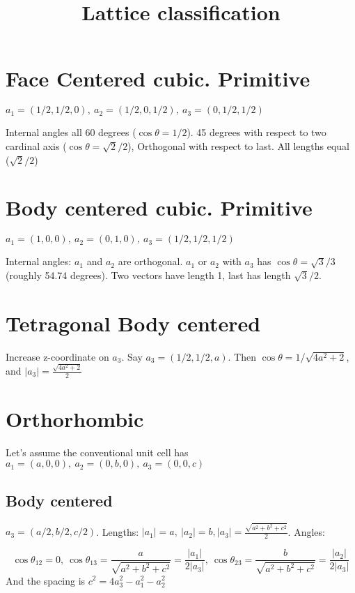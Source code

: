 \documentclass[a4paper,10pt]{article} 	%
\title{Lattice classification}
\author{}
\date{}
\numberwithin{equation}{section}
\begin{document}
	\maketitle

	\section{Face Centered cubic. Primitive}
	$a_1 = (1/2, 1/2, 0),\ a_2 = (1/2, 0, 1/2),\ a_3 = (0, 1/2, 1/2)$
	
	Internal angles all 60 degrees ($\cos \theta = 1/2$). 45 degrees with respect to two cardinal axis ($\cos \theta = \sqrt{2}/2$), Orthogonal with respect to last. All lengths equal ($\sqrt{2}/2$)
	
	\section{Body centered cubic. Primitive}
	$ a_1 = (1,0,0),\ a_2 = (0,1,0),\ a_3 = (1/2,1/2,1/2) $
	
	Internal angles: $a_1$ and $a_2$ are orthogonal. $a_1$ or $a_2$ with $a_3$ has $\cos \theta = \sqrt{3}/3 $ (roughly 54.74 degrees). Two vectors have length 1, last has length $\sqrt{3}/2$.
	
	\section{Tetragonal Body centered}
	Increase z-coordinate on $a_3$. Say $a_3 = (1/2,1/2,a) $. Then $\cos \theta = 1/\sqrt{4a^2+2} $, and $|a_3| = \frac{\sqrt{4a^2+2}}{2}$
	
	\section{Orthorhombic}
	Let's assume the conventional unit cell has $a_1 = (a,0,0),\ a_2 = (0,b,0),\ a_3 = (0,0,c)$
	
	\subsection{Body centered}
	$a_3 = (a/2, b/2, c/2)$. Lengths: $|a_1| = a,\ |a_2| = b, |a_3| = \frac{\sqrt{a^2+b^2+c^2}}{2}$. Angles: 
	
	\begin{equation}
		\cos \theta_{12} = 0,\ \cos \theta_{13} = \frac{a}{\sqrt{a^2+b^2+c^2}} = \frac{|a_1|}{2|a_3|},\ \cos \theta_{23} = \frac{b}{\sqrt{a^2+b^2+c^2}} = \frac{|a_2|}{2|a_3|}
	\end{equation}
	And the spacing is $ c^2 = 4a_3^2-a_1^2-a_2^2 $
	
\end{document}
